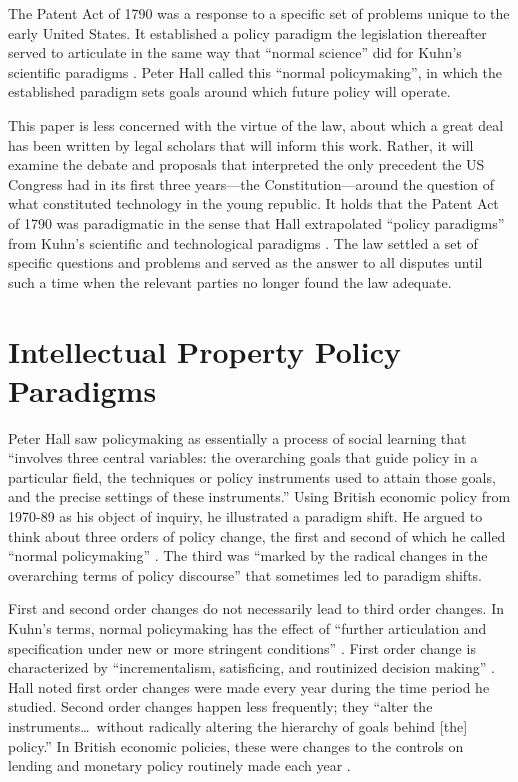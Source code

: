 \documentclass[12pt,letterpaper]{article}
\begin{document}
{The Patent Act of 1790 was a response to a specific set of problems unique to the early United States. It established a policy paradigm the legislation thereafter served to articulate in the same way that ``normal science'' did for Kuhn's scientific paradigms \autocite{Kuhn1970}. Peter Hall called this ``normal policymaking'', in which the established paradigm sets goals around which future policy will operate.

This paper is less concerned with the virtue of the law, about which a great deal has been written by legal scholars that will inform this work. Rather, it will examine the debate and proposals that interpreted the only precedent the US Congress had in its first three years---the Constitution---around the question of what constituted technology in the young republic. It holds that the Patent Act of 1790 was paradigmatic in the sense that Hall extrapolated ``policy paradigms'' from Kuhn's scientific and technological paradigms \autocite{Hall1993, Kuhn1970}. The law settled a set of specific questions and problems and served as the answer to all disputes until such a time when the relevant parties no longer found the law adequate.

\section{Intellectual Property Policy Paradigms}

Peter Hall saw policymaking as essentially a process of social learning that ``involves three central variables: the overarching goals that guide policy in a particular field, the techniques or policy instruments used to attain those goals, and the precise settings of these instruments.'' Using British economic policy from 1970-89 as his object of inquiry, he illustrated a paradigm shift. He argued to think about three orders of policy change, the first and second of which he called ``normal policymaking'' \autocite{Hall1993}. The third was ``marked by the radical changes in the overarching terms of policy discourse'' that sometimes led to paradigm shifts. 

First and second order changes do not necessarily lead to third order changes. In Kuhn's terms, normal policymaking has the effect of ``further articulation and specification under new or more stringent conditions'' \autocite{Kuhn1970}. First order change is characterized by ``incrementalism, satisficing, and routinized decision making'' \autocite{Hall1993}. Hall noted first order changes were made every year during the time period he studied.  Second order changes happen less frequently; they ``alter the instruments\ldots~without radically altering the hierarchy of goals behind [the] policy.'' In British economic policies, these were changes to the controls on lending and monetary policy routinely made each year \autocite{Hall1993}.

}
\end{document}
